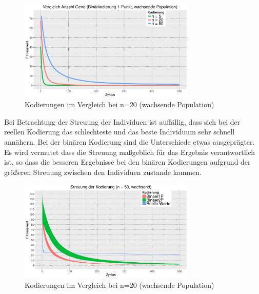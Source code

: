 \documentclass[12pt,
    a4paper,
    headinclude,
    footinclude]{scrreprt}
\begin{document}
	\begin{figure}[H]
		\includegraphics[width=0.75\textwidth]{../abb3_different_n.jpeg} 
		
		\caption*{Kodierungen im Vergleich bei n=20 (wachsende Population)} 
		\label{InputOutput}
	\end{figure}



Bei Betrachtung der Streuung der Individuen ist auffällig, dass sich bei der reellen Kodierung das schlechteste und das beste Individuum sehr schnell annähern. Bei der binären Kodierung sind die Unterschiede etwas ausgeprägter. Es wird vermutet dass die Streuung maßgeblich für das Ergebnis verantwortlich ist, so dass die besseren Ergebnisse bei den binären Kodierungen aufgrund der größeren Streuung zwischen den Individuen zustande kommen.

	\begin{figure}[H]
		\includegraphics[width=0.75\textwidth]{../abb4_streuung.jpeg} 
		
		\caption*{Kodierungen im Vergleich bei n=20 (wachsende Population)} 
		\label{InputOutput}
	\end{figure}



	
	

	

	
	

	
\end{document}
